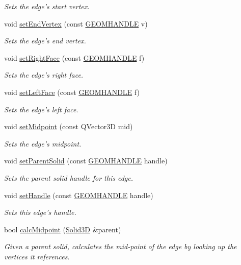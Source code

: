 \begin{DoxyCompactItemize}
\begin{DoxyCompactList}\small\item\em Sets the edge's start vertex. \end{DoxyCompactList}\item 
void \hyperlink{class_edge3_d_a32ff76ad3559822c44c8faa8519fdf74}{set\-End\-Vertex} (const \hyperlink{vertex_8h_a72202e57358ed73cd212e9a2eaf39aeb}{G\-E\-O\-M\-H\-A\-N\-D\-L\-E} v)
\begin{DoxyCompactList}\small\item\em Sets the edge's end vertex. \end{DoxyCompactList}\item 
void \hyperlink{class_edge3_d_a9960f64e5fceb5a6dc828893fe704cb6}{set\-Right\-Face} (const \hyperlink{vertex_8h_a72202e57358ed73cd212e9a2eaf39aeb}{G\-E\-O\-M\-H\-A\-N\-D\-L\-E} f)
\begin{DoxyCompactList}\small\item\em Sets the edge's right face. \end{DoxyCompactList}\item 
void \hyperlink{class_edge3_d_a1d87d3eed968ddce326ac07cc7c98e34}{set\-Left\-Face} (const \hyperlink{vertex_8h_a72202e57358ed73cd212e9a2eaf39aeb}{G\-E\-O\-M\-H\-A\-N\-D\-L\-E} f)
\begin{DoxyCompactList}\small\item\em Sets the edge's left face. \end{DoxyCompactList}\item 
void \hyperlink{class_edge3_d_a5b5e77a0d19f391cf987510111bc32f6}{set\-Midpoint} (const Q\-Vector3\-D mid)
\begin{DoxyCompactList}\small\item\em Sets the edge's midpoint. \end{DoxyCompactList}\item 
void \hyperlink{class_edge3_d_ad905287b0350a41fcf82c638e247255c}{set\-Parent\-Solid} (const \hyperlink{vertex_8h_a72202e57358ed73cd212e9a2eaf39aeb}{G\-E\-O\-M\-H\-A\-N\-D\-L\-E} handle)
\begin{DoxyCompactList}\small\item\em Sets the parent solid handle for this edge. \end{DoxyCompactList}\item 
void \hyperlink{class_edge3_d_a7ad6b919f69ee151ce78a3d5d2b41096}{set\-Handle} (const \hyperlink{vertex_8h_a72202e57358ed73cd212e9a2eaf39aeb}{G\-E\-O\-M\-H\-A\-N\-D\-L\-E} handle)
\begin{DoxyCompactList}\small\item\em Sets this edge's handle. \end{DoxyCompactList}\item 
bool \hyperlink{class_edge3_d_a9cd240bf4c0f68b3085777935e11fb85}{calc\-Midpoint} (\hyperlink{class_solid3_d}{Solid3\-D} \&parent)
\begin{DoxyCompactList}\small\item\em Given a parent solid, calculates the mid-\/point of the edge by looking up the vertices it references. \end{DoxyCompactList}\end{DoxyCompactItemize}
